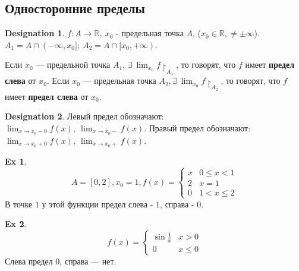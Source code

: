 \documentclass[11pt]{book}
\newcommand{\R}{\mathbb{R}}
\renewcommand{\le}{\leqslant}
\theoremstyle{definition}
\theoremstyle{plain}
\theoremstyle{plain}
\theoremstyle{definition}
\newtheorem*{ex}{Ex}
\newtheorem*{name}{Designation}
\theoremstyle{remark}
\begin{document}
\subsection{Односторонние пределы}
    \begin{name}
$f: A \to \R, ~x_0$ - предельная точка $A$, ($x_0 \in \R, \neq \pm \infty $).
$A_1 = A \cap (- \infty, x_0];~ A_2 = A \cap [x_0, + \infty)$.
    \end{name}
\begin{defn} 
Если $x_0$  --- предельной точка $A_1$, $ \exists ~\lim_{x_0}{f\!\upharpoonright_{A_1}}$, то говорят, что $f$ имеет {\bf   предел слева} от $x_0$.
Если $x_0$ --- предельная точка $A_2, \exists ~\lim_{x_0}{f\!\upharpoonright_{A_2}}$, то говорят, что $f$ имеет {\bf предел слева} от $x_0$. 
\begin{name}
Левый предел обозначают: $\lim_{x \to x_0 - 0}{f(x)}, ~\lim_{x \to      x_0-}{f(x)}$. 
Правый предел обозначают: $\lim_{x \to x_0 + 0}{f(x)}, ~\lim_{x \to x_0+}{f(x)}$. 
\end{name}
\end{defn} 
 
\begin{ex} 
	 $$A = [0, 2], x_0 = 1, f(x) =  
\begin{cases} 
    x& 0 \le x < 1\\ 
2& x = 1\\ 
0& 1 < x \le 2 
\end{cases}
$$ 
В точке $1$ у этой функции предел слева - $1$, справа - $0$. 
\end{ex}
\begin{ex} 
$$f(x) =  
\begin{cases} 
    \sin{\frac{1}{x}}& x > 0\\ 
    0& x \le 0 
\end{cases}
$$ 
Слева предел $0$, справа --- нет. 
\end{ex} 
\end{document}
